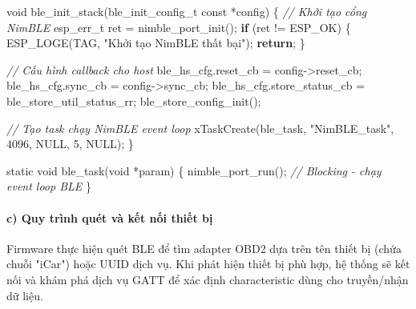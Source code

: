\documentclass[a4paper]{extarticle}
\newenvironment{Shaded}{}{}
\newcommand{\CommentTok}[1]{\textcolor[rgb]{0.38,0.63,0.69}{\textit{#1}}}
\newcommand{\ControlFlowTok}[1]{\textcolor[rgb]{0.00,0.44,0.13}{\textbf{#1}}}
\newcommand{\DataTypeTok}[1]{\textcolor[rgb]{0.56,0.13,0.00}{#1}}
\newcommand{\DecValTok}[1]{\textcolor[rgb]{0.25,0.63,0.44}{#1}}
\newcommand{\NormalTok}[1]{#1}
\newcommand{\OperatorTok}[1]{\textcolor[rgb]{0.40,0.40,0.40}{#1}}
\newcommand{\StringTok}[1]{\textcolor[rgb]{0.25,0.44,0.63}{#1}}
\begin{document}
\begin{Shaded}
\begin{Highlighting}[]
\DataTypeTok{void}\NormalTok{ ble\_init\_stack}\OperatorTok{(}\NormalTok{ble\_init\_config\_t }\DataTypeTok{const} \OperatorTok{*}\NormalTok{config}\OperatorTok{)}
\OperatorTok{\{}
    \CommentTok{// Khởi tạo cổng NimBLE}
\NormalTok{    esp\_err\_t ret }\OperatorTok{=}\NormalTok{ nimble\_port\_init}\OperatorTok{();}
    \ControlFlowTok{if} \OperatorTok{(}\NormalTok{ret }\OperatorTok{!=}\NormalTok{ ESP\_OK}\OperatorTok{)} \OperatorTok{\{}
\NormalTok{        ESP\_LOGE}\OperatorTok{(}\NormalTok{TAG}\OperatorTok{,} \StringTok{"Khởi tạo NimBLE thất bại"}\OperatorTok{);}
        \ControlFlowTok{return}\OperatorTok{;}
    \OperatorTok{\}}

    \CommentTok{// Cấu hình callback cho host}
\NormalTok{    ble\_hs\_cfg}\OperatorTok{.}\NormalTok{reset\_cb        }\OperatorTok{=}\NormalTok{ config}\OperatorTok{{-}\textgreater{}}\NormalTok{reset\_cb}\OperatorTok{;}
\NormalTok{    ble\_hs\_cfg}\OperatorTok{.}\NormalTok{sync\_cb         }\OperatorTok{=}\NormalTok{ config}\OperatorTok{{-}\textgreater{}}\NormalTok{sync\_cb}\OperatorTok{;}
\NormalTok{    ble\_hs\_cfg}\OperatorTok{.}\NormalTok{store\_status\_cb }\OperatorTok{=}\NormalTok{ ble\_store\_util\_status\_rr}\OperatorTok{;}
\NormalTok{    ble\_store\_config\_init}\OperatorTok{();}

    \CommentTok{// Tạo task chạy NimBLE event loop}
\NormalTok{    xTaskCreate}\OperatorTok{(}\NormalTok{ble\_task}\OperatorTok{,} \StringTok{"NimBLE\_task"}\OperatorTok{,} \DecValTok{4096}\OperatorTok{,}\NormalTok{ NULL}\OperatorTok{,} \DecValTok{5}\OperatorTok{,}\NormalTok{ NULL}\OperatorTok{);}
\OperatorTok{\}}

\DataTypeTok{static} \DataTypeTok{void}\NormalTok{ ble\_task}\OperatorTok{(}\DataTypeTok{void} \OperatorTok{*}\NormalTok{param}\OperatorTok{)}
\OperatorTok{\{}
\NormalTok{    nimble\_port\_run}\OperatorTok{();}  \CommentTok{// Blocking {-} chạy event loop BLE}
\OperatorTok{\}}
\end{Highlighting}
\end{Shaded}

\paragraph{c) Quy trình quét và kết nối thiết
bị}\label{c-quy-truxecnh-quuxe9t-vuxe0-kux1ebft-nux1ed1i-thiux1ebft-bux1ecb}

Firmware thực hiện quét BLE để tìm adapter OBD2 dựa trên tên thiết bị
(chứa chuỗi "iCar") hoặc UUID dịch vụ. Khi phát hiện thiết bị phù hợp,
hệ thống sẽ kết nối và khám phá dịch vụ GATT để xác định characteristic
dùng cho truyền/nhận dữ liệu.
\end{document}
